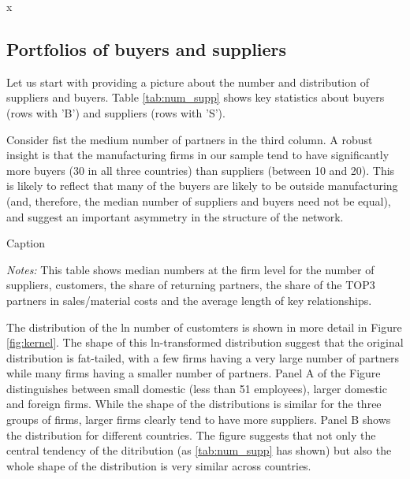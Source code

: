 x\documentclass[final, dvipsnames, authoryear,12pt]{elsarticle}
\begin{document}
\subsection{Portfolios of buyers and suppliers}

Let us start with providing a picture about the number and distribution of suppliers and buyers. Table \ref{tab:num_supp} shows key statistics about buyers (rows with 'B') and suppliers (rows with 'S'). 

Consider fist the medium number of partners in the third column. A robust insight is that the manufacturing firms in our sample tend to have significantly more buyers (30 in all three countries) than suppliers (between 10 and 20). This is likely to reflect that many of the buyers are likely to be outside manufacturing (and, therefore, the median number of suppliers and buyers need not be equal), and suggest an important asymmetry in the structure of the network. 

\begin{table}[H]
    \caption{Caption}
    \label{tab:num_supp}
    \centerline{
    }
    {\scriptsize \textit{Notes:} This table shows median numbers at the firm level for the number of suppliers, customers, the share of returning partners, the share of the TOP3 partners in sales/material costs and the average length of key relationships.}
\end{table}


The distribution of the ln number of customters is shown in more detail in Figure \ref{fig:kernel}. The shape of this ln-transformed distribution suggest that the original distribution is fat-tailed, with a few firms having a very large number of partners while many firms having a smaller number of partners. Panel A of the Figure distinguishes between small domestic (less than 51 employees), larger domestic and foreign firms. While the shape of the distributions is similar for the three groups of firms, larger firms clearly tend to have more suppliers. Panel B shows the distribution for different countries. The figure suggests that not only the central tendency of the ditribution (as \ref{tab:num_supp} has shown) but also the whole shape of the distribution is very similar across countries.
\end{document}
